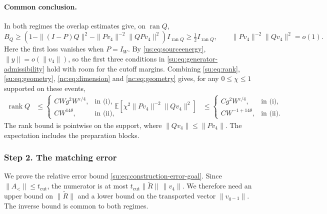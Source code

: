 \documentclass[11pt]{article}
\numberwithin{equation}{section}
\theoremstyle{remark}
\newcommand{\E}{\mathbb E}
\newcommand{\rank}{\operatorname{rank}}
\newcommand{\ran}{\operatorname{ran}}
\begin{document}
\paragraph{Common conclusion.}
In both regimes the overlap estimates give, on $\ran Q$,
\[
 B_Q\ge\left(1-\|(I-P)Q\|^2-
       \|Pv_4\|^{-2} \|QPv_4\|^2\right)I_{\ran Q}
 \ge\tfrac12 I_{\ran Q},\qquad
 \|Pv_4\|^{-2} \|Qv_4\|^2=o(1).
\]
Here the first loss vanishes when $P=I_W$. By \eqref{us:eq:sourceenergy},
$\|y\|=o(\|v_4\|)$, so the first three conditions in
\eqref{su:eq:generator-admissibility} hold with room for the cutoff
margins. Combining \eqref{su:eq:rank}, \eqref{su:eq:geometry},
\eqref{nc:eq:dimension} and \eqref{nc:eq:geometry} gives, for any
$0\le\chi\le1$ supported on these events,
\begin{equation}\label{su:eq:construction-overlap-goals}
 \begin{aligned}
 \rank Q&\le
 \begin{cases}CWg^2W^{\varepsilon/4},&\text{in (i)},\\
 CW^{14\theta},&\text{in (ii)},\end{cases}
 &\E\!\left[\chi^2\|Pv_4\|^{-2} \|Qv_4\|^2\right]&\le
 \begin{cases}Cg^2W^{\varepsilon/4},&\text{in (i)},\\
 CW^{-1+14\theta},&\text{in (ii)}.\end{cases}
 \end{aligned}
\end{equation}
The rank bound is pointwise on the support, where $\|Qv_4\|\le\|Pv_4\|$.
The expectation includes the preparation blocks.

\subsubsection{Step 2. The matching error}
\label{su:sec:error-derivative-estimates}
\label{su:sec:discarded-output}

We prove the relative error bound \eqref{su:eq:construction-error-goal}.
Since $\|A_<\|\le t_{\mathrm{cut}}$, the numerator is at most
$t_{\mathrm{cut}}\|\widetilde R\|\,\|v_4\|$. We therefore need an upper bound on
$\|\widetilde R\|$ and a lower bound on the transported vector
$\|v_{q-1}\|$. The inverse bound is common to both regimes.
\end{document}
